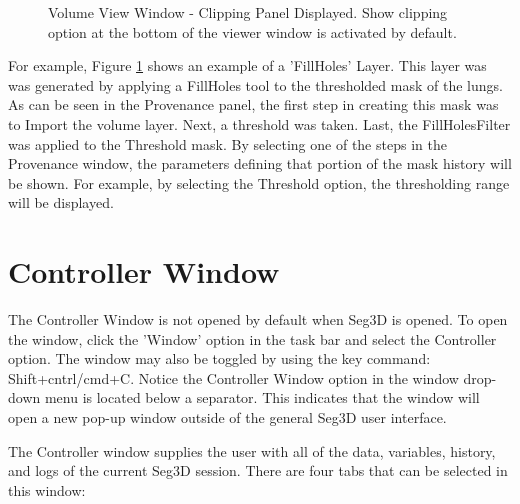 \documentclass[fleqn,11pt,openany]{book}
\begin{document}
\begin{figure}[b!]
\caption{Volume View Window - Clipping Panel Displayed. Show clipping option at the bottom of the viewer window is activated by default.}\label{fig:ProvenanceWindow}
\end{figure}

For example, Figure \ref{fig:ProvenanceWindow} shows an example of a 'FillHoles' Layer.
This layer was was generated by applying a FillHoles tool to the thresholded mask of the lungs.
As can be seen in the Provenance panel, the first step in creating this mask was to Import the volume layer.  
Next, a threshold was taken.  Last, the FillHolesFilter was applied to the Threshold mask.
By selecting one of the steps in the Provenance window, the parameters defining that portion of the mask history will be shown.
For example, by selecting the Threshold option, the thresholding range will be displayed.

\section{Controller Window}
The Controller Window is not opened by default when Seg3D is opened.  To open the window, click the 'Window' option in the task bar and select the Controller option.  The window may also be toggled by using the key command: Shift+cntrl/cmd+C.
Notice the Controller Window option in the window drop-down menu is located below a separator.  
This indicates that the window will open a new pop-up window outside of the general Seg3D user interface.

The Controller window supplies the user with all of the data, variables, history, and logs of the current Seg3D session.
There are four tabs that can be selected in this window:
\end{document}
